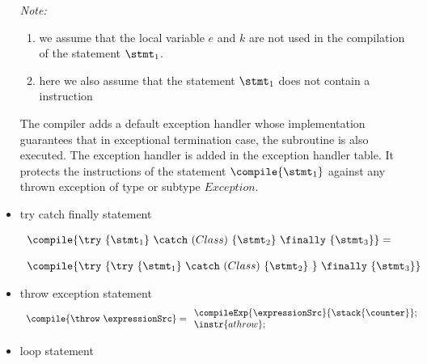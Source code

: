 \begin{itemize}
\textit{Note:} 
\begin{enumerate}
          \item we assume that the local variable $e$  and $k$ are not used in the compilation of the statement $\stmt_1$. 
          \item here we also assume that the statement $\stmt_1$ does not contain a  instruction 
\end{enumerate}


The compiler adds a default exception handler whose 
implementation guarantees that in exceptional termination case, the subroutine is also executed. The exception handler is added in the exception handler table. 
It protects the instructions of the statement $ \compile{\stmt_1} $ against any thrown exception of type or subtype $Exception$.     

\item try catch finally statement

   $$  \begin{array}{l}  
               \compile{  \try \ \{ \stmt_1 \} \ \catch \ (Class ) \ \{ \stmt_2 \} \ \finally \ \{ \stmt_3 \} } 
                = \\
		\\ 
     \compile{ \try \ \{ \try \ \{ \stmt_1 \} \ \catch \ (Class ) \ \{ \stmt_2 \} \ \} \  \finally \ \{ \stmt_3 \} }
     \end{array}
 $$




 \item throw exception statement
 $$\begin{array}{l} 
             \compile{\throw \ \expressionSrc} = 
             \begin{array}{l} 
	           \compileExp{ \expressionSrc}{\stack{\counter}}; \\
	           \instr{athrow}; 
	        \end{array} 
 \end{array}$$ 
                               

      \item loop statement


\end{itemize}
